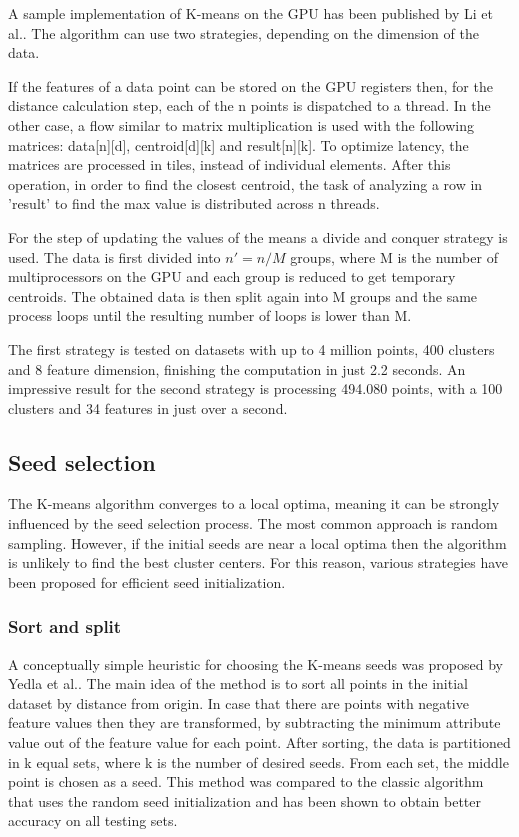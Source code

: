 \documentclass[12pt]{article}
\begin{document}
	A sample implementation of K-means on the GPU has been published by Li et al.\cite{GPUKmeans}. The algorithm can use two strategies, depending on the dimension of the data. 
	
	If the features of a data point can be stored on the GPU registers then, for the distance calculation step, each of the n points is dispatched to a thread. In the other case, a flow similar to matrix multiplication is used with the following matrices: data[n][d], centroid[d][k] and result[n][k]. To optimize latency, the matrices are processed in tiles, instead of individual elements. After this operation, in order to find the closest centroid, the task of analyzing a row in 'result' to find the max value is distributed across n threads.
	
	For the step of updating the values of the means a divide and conquer strategy is used. The data is first divided into \(n'=n/M\) groups, where M is the number of multiprocessors on the GPU and each group is reduced to get temporary centroids. The obtained data is then split again into M groups and the same process loops until the resulting number of loops is lower than M.
	
	The first strategy is tested on datasets with up to 4 million points, 400 clusters and 8 feature dimension, finishing the computation in just 2.2 seconds. An impressive result for the second strategy is processing 494.080 points, with a 100 clusters and 34 features in just over a second.
	
	\subsection{Seed selection}
	\label{sec:seeds}
	The K-means algorithm converges to a local optima\cite{AlgorithmsForClusteringData}, meaning it can be strongly influenced by the seed selection process. The most common approach is random sampling. However, if the initial seeds are near a local optima then the algorithm is unlikely to find the best cluster centers. For this reason, various strategies have been proposed for efficient seed initialization.
	
	\subsubsection{Sort and split}
	A conceptually simple heuristic for choosing the K-means seeds was proposed by Yedla et al.\cite{SortSeed}. The main idea of the method is to sort all points in the initial dataset by distance from origin. In case that there are points with negative feature values then they are transformed, by subtracting the minimum attribute value out of the feature value for each point. After sorting, the data is partitioned in k equal sets, where k is the number of desired seeds. From each set, the middle point is chosen as a seed. This method was compared to the classic algorithm that uses the random seed initialization and has been shown to obtain better accuracy on all testing sets.
	
\end{document}
